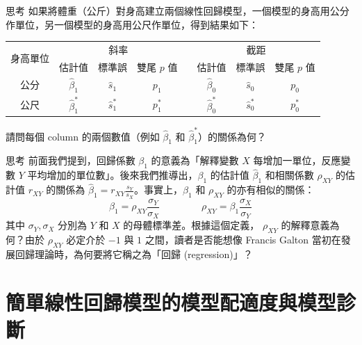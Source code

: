     \bigskip

    \begin{custom}{思考}
       如果將體重（公斤）對身高建立兩個線性回歸模型，一個模型的身高用公分作單位，另一個模型的身高用公尺作單位，得到結果如下：

       \medskip
       
       \begin{tabular}{cccccccc}
            \toprule
            \multirow{2}{*}{身高單位} & \multicolumn{3}{c}{斜率} && \multicolumn{3}{c}{截距} \\
            \cline{2-4}\cline{6-8}
            & 估計值 & 標準誤 & 雙尾 $p$ 值 && 估計值 & 標準誤 & 雙尾 $p$ 值\\
            \hline
            公分 & $\hat{\beta}_1$ & $\hat{s}_1$ & $p_1$ && $\hat{\beta}_0$ & $\hat{s}_0$ & $p_0$ \\  
            公尺 & $\hat{\beta}_1^*$ & $\hat{s}_1^*$ & $p_1^*$ && $\hat{\beta}_0^*$ & $\hat{s}_0^*$ & $p_0^*$ \\
            \bottomrule
       \end{tabular}

       \medskip

       \noindent 請問每個 column 的兩個數值（例如 $\hat{\beta}_1$ 和 $\hat{\beta}_1^*$）的關係為何？
    \end{custom}

    \bigskip

    \begin{custom}{思考}
       前面我們提到，回歸係數 $\beta_1$ 的意義為「解釋變數 $X$ 每增加一單位，反應變數 $Y$ 平均增加的單位數」。後來我們推導出，$\beta_1$ 的估計值 $\hat{\beta}_1$ 和相關係數 $\rho_{XY}$ 的估計值 $r_{XY}$ 的關係為 $\hat{\beta}_1 = r_{XY} \frac{s_Y}{s_X}$。事實上，$\beta_1$ 和 $\rho_{XY}$ 的亦有相似的關係：
       \[\beta_1 = \rho_{XY} \frac{\sigma_Y}{\sigma_X} \qquad \; \qquad \rho_{XY} = \beta_1 \frac{\sigma_X}{\sigma_Y}\]
       其中 $\sigma_Y, \sigma_X$ 分別為 $Y$ 和 $X$ 的母體標準差。根據這個定義， $\rho_{XY}$ 的解釋意義為何？由於 $\rho_{XY}$ 必定介於 $-1$ 與 $1$ 之間，讀者是否能想像 Francis Galton 當初在發展回歸理論時，為何要將它稱之為「回歸 (regression)」？
    \end{custom}
    
    \section{簡單線性回歸模型的模型配適度與模型診斷}

